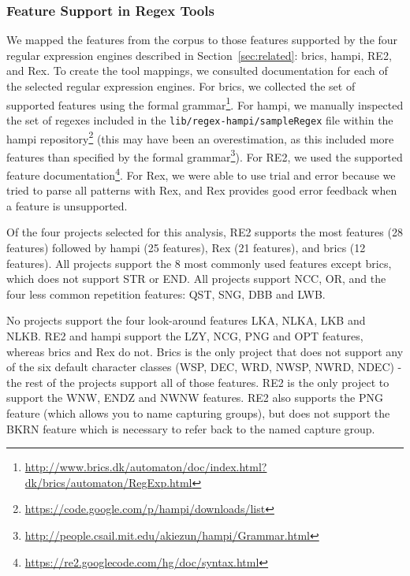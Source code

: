 \subsubsection{Feature Support in Regex Tools}
 We  mapped the features from the corpus to those features supported by the four regular expression engines described in Section~\ref{sec:related}: brics, hampi, RE2, and Rex.
To create the tool mappings, we consulted documentation for each of the selected regular expression engines. For brics, we collected the set of supported features using the formal grammar\footnote{\url{http://www.brics.dk/automaton/doc/index.html?dk/brics/automaton/RegExp.html}}.  For hampi, we manually inspected the set of regexes included in the {\tt lib/regex-hampi/sampleRegex} file within the hampi repository\footnote{\url{https://code.google.com/p/hampi/downloads/list}} (this may have been an overestimation, as this included more features than specified by the formal grammar\footnote{\url{http://people.csail.mit.edu/akiezun/hampi/Grammar.html}}).  For RE2, we used the  supported feature documentation\footnote{\url{https://re2.googlecode.com/hg/doc/syntax.html}}.  For Rex, we were able to use trial and error because we tried to parse all patterns with Rex, and Rex provides good error feedback when a feature is unsupported.



Of the four projects selected for this analysis, RE2 supports the most features (28 features) followed by hampi (25 features),  Rex (21 features), and brics (12 features).  All projects support the 8 most commonly used features except brics, which does not support STR or END.  All projects support NCC, OR, and the four less common repetition features: QST, SNG, DBB and LWB.

No projects support the four look-around features LKA, NLKA, LKB and NLKB.  RE2 and hampi support the LZY, NCG, PNG and OPT features, whereas brics and Rex do not.  Brics is the only project that does not support any of the six default character classes (WSP, DEC, WRD, NWSP, NWRD, NDEC) - the rest of the projects support all of those features.  RE2 is the only project to support the WNW, ENDZ and NWNW features.  RE2 also supports the PNG feature (which allows you to name capturing groups), but does not support the BKRN feature which is necessary to refer back to the named capture group.

